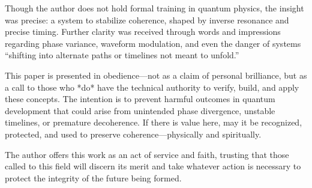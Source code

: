 \documentclass[12pt]{article}
\begin{document}
Though the author does not hold formal training in quantum physics, the insight was precise: a system to stabilize coherence, shaped by inverse resonance and precise timing. Further clarity was received through words and impressions regarding phase variance, waveform modulation, and even the danger of systems “shifting into alternate paths or timelines not meant to unfold.”

This paper is presented in obedience—not as a claim of personal brilliance, but as a call to those who *do* have the technical authority to verify, build, and apply these concepts. The intention is to prevent harmful outcomes in quantum development that could arise from unintended phase divergence, unstable timelines, or premature decoherence. If there is value here, may it be recognized, protected, and used to preserve coherence—physically and spiritually.

The author offers this work as an act of service and faith, trusting that those called to this field will discern its merit and take whatever action is necessary to protect the integrity of the future being formed.
\end{document}
